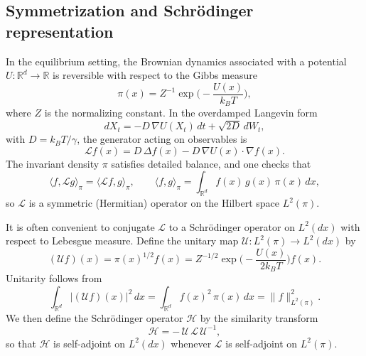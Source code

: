 \documentclass[11pt]{article}
\begin{document}
\subsection*{Symmetrization and Schr\"odinger representation}

In the equilibrium setting, the Brownian dynamics associated with a potential $U:\mathbb R^d\to\mathbb R$ is reversible with respect to the Gibbs measure
\begin{equation}
\pi(x)
=
Z^{-1}\exp\!\Big(-\frac{U(x)}{k_B T}\Big),
\end{equation}
where $Z$ is the normalizing constant. In the overdamped Langevin form
\begin{equation}
dX_t = -D\,\nabla U(X_t)\,dt + \sqrt{2D}\,dW_t,
\end{equation}
with $D = k_B T/\gamma$, the generator acting on observables is
\begin{equation}
\mathcal L f(x)
=
D\,\Delta f(x) - D\,\nabla U(x)\cdot\nabla f(x).
\end{equation}
The invariant density $\pi$ satisfies detailed balance, and one checks that
\begin{equation}
\langle f,\mathcal L g\rangle_{\pi}
=
\langle \mathcal L f,g\rangle_{\pi},
\qquad
\langle f,g\rangle_{\pi}
=
\int_{\mathbb R^d} f(x)\,g(x)\,\pi(x)\,dx,
\end{equation}
so $\mathcal L$ is a symmetric (Hermitian) operator on the Hilbert space $L^2(\pi)$.

It is often convenient to conjugate $\mathcal L$ to a Schr\"odinger operator on $L^2(dx)$ with respect to Lebesgue measure. Define the unitary map $\mathcal U : L^2(\pi)\to L^2(dx)$ by
\begin{equation}
(\mathcal U f)(x)
=
\pi(x)^{1/2} f(x)
=
Z^{-1/2}\exp\!\Big(-\frac{U(x)}{2k_B T}\Big) f(x).
\end{equation}
Unitarity follows from
\begin{equation}
\int_{\mathbb R^d} |(\mathcal U f)(x)|^2\,dx
=
\int_{\mathbb R^d} f(x)^2\,\pi(x)\,dx
=
\|f\|_{L^2(\pi)}^2.
\end{equation}
We then define the Schr\"odinger operator $\mathcal H$ by the similarity transform
\begin{equation}
\mathcal H
=
-\,\mathcal U\,\mathcal L\,\mathcal U^{-1},
\end{equation}
so that $\mathcal H$ is self-adjoint on $L^2(dx)$ whenever $\mathcal L$ is self-adjoint on $L^2(\pi)$.
\end{document}
